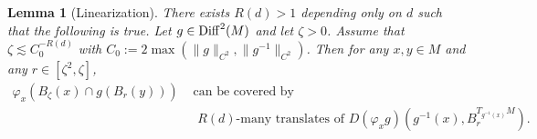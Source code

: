\documentclass[11pt, leqno, fleqn]{amsart}
\newcommand{\margem}[1]{\marginpar{{\scriptsize {#1}}}}
\def\clo{   \color{orange}}
\def \R{{\mathbb R}}
\newtheorem{lemma}[thm]{\bf Lemma}
\theoremstyle{definition}
\newtheorem{rema}[thm]{\bf Remark}
\theoremstyle{definition}
\newcommand{\Diff}{{\rm Diff}}
\begin{document}
		 

\begin{lemma}[Linearization] \label{lin-chart}
	There exists	$R(d) > 1$ depending only on $d$ such that the following is true.
Let $g\in \Diff^2(M)$ and let $\zeta>0$. Assume that $\zeta \lesssim C_0^{-R(d)}$ with   $C_0 :=2\max(\|g\|_{C^2}, \|g^{-1}\|_{C^2} )$.
 Then for any  $x, y \in M$      and any   $r\in [\zeta^2, \zeta] $,   
     		\begin{align*}
		\text{$\varphi_x(B_{\zeta}(x) \cap g ( B_{r}(y) ) )$} &   \text{ can be covered by}\\
		&\text{ $R(d)$-many  translates of   $D(\varphi_x g) \left( g^{-1}(x),  B^{T_{g^{-1}(x)}M}_{r} \right)$.}
		\end{align*}
\end{lemma}			

\end{document}
